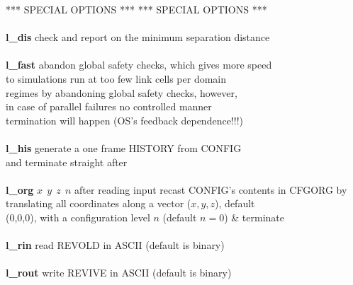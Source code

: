 \begin{tabbing}
\> *** SPECIAL OPTIONS ***                      \> *** SPECIAL OPTIONS *** \\
\>                                              \> \\
\> {\bf l\_dis}                                 \> check and report on the minimum separation distance \\
\>                                              \> \\
\> {\bf l\_fast}                                \> abandon global safety checks, which gives more speed \\
\>                                              \> to simulations run at too few link cells per domain \\
\>                                              \> regimes by abandoning global safety checks, however, \\
\>                                              \> in case of parallel failures no controlled manner \\
\>                                              \> termination will happen (OS's feedback dependence!!!) \\
\>                                              \> \\
\> {\bf l\_his}                                 \> generate a one frame HISTORY from CONFIG \\
\>                                              \> and terminate straight after \\
\>                                              \> \\
\> {\bf l\_org} $x~~y~~z~~n$                    \> after reading input recast CONFIG's contents in CFGORG by \\
\>                                              \> translating all coordinates along a vector ($x,y,z$), default \\
\>                                              \> (0,0,0), with a configuration level $n$ (default $n=0$) \& terminate \\
\>                                              \> \\
\> {\bf l\_rin}                                 \> read REVOLD in ASCII (default is binary) \\
\>                                              \> \\
\> {\bf l\_rout}                                \> write REVIVE in ASCII (default is binary) \\
\>                                              \> \\

\end{tabbing}
